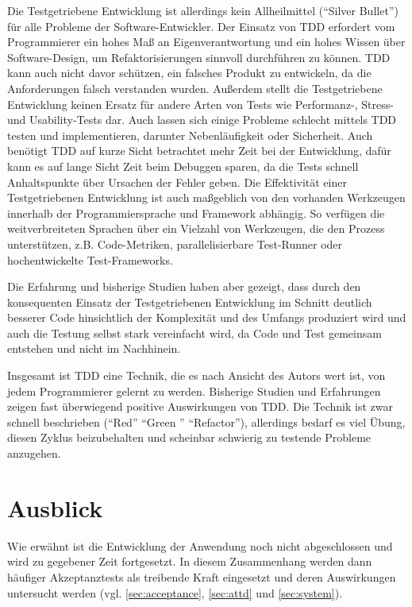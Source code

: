 Die Testgetriebene Entwicklung ist allerdings kein Allheilmittel ("`Silver Bullet"') für alle Probleme der Software-Entwickler. Der Einsatz von TDD erfordert vom Programmierer ein hohes Maß an Eigenverantwortung und ein hohes Wissen über Software-Design, um Refaktorisierungen sinnvoll durchführen zu können. TDD kann auch nicht davor schützen, ein falsches Produkt zu entwickeln, da die Anforderungen falsch verstanden wurden. Außerdem stellt die Testgetriebene Entwicklung keinen Ersatz für andere Arten von Tests wie Performanz-, Stress- und Usability-Tests dar. Auch lassen sich einige Probleme schlecht mittels TDD testen und implementieren, darunter Nebenläufigkeit oder Sicherheit. Auch benötigt TDD auf kurze Sicht betrachtet mehr Zeit bei der Entwicklung, dafür kann es auf lange Sicht Zeit beim Debuggen sparen, da die Tests schnell Anhaltspunkte über Ursachen der Fehler geben.
Die Effektivität einer Testgetriebenen Entwicklung ist auch maßgeblich von den vorhanden Werkzeugen innerhalb der Programmiersprache und Framework abhängig. So verfügen die weitverbreiteten Sprachen über ein Vielzahl von Werkzeugen, die den Prozess unterstützen, z.B. Code-Metriken, parallelisierbare Test-Runner oder hochentwickelte Test-Frameworks.

Die Erfahrung und bisherige Studien haben aber gezeigt, dass durch den konsequenten Einsatz der Testgetriebenen Entwicklung im Schnitt deutlich besserer Code hinsichtlich der Komplexität und des Umfangs produziert wird und auch die Testung selbst stark vereinfacht wird, da Code und Test gemeinsam entstehen und nicht im Nachhinein.

Insgesamt ist TDD eine Technik, die es nach Ansicht des Autors wert ist, von jedem Programmierer gelernt zu werden. Bisherige Studien und Erfahrungen zeigen fast überwiegend positive Auswirkungen von TDD. Die Technik ist zwar schnell beschrieben ("`Red"' "`Green "' "`Refactor"'), allerdings bedarf es viel Übung, diesen Zyklus beizubehalten und scheinbar schwierig zu testende Probleme anzugehen.

\section{Ausblick}
Wie erwähnt ist die Entwicklung der Anwendung noch nicht abgeschlossen und wird zu gegebener Zeit fortgesetzt. In diesem Zusammenhang werden dann häufiger Akzeptanztests als treibende Kraft eingesetzt und deren Auswirkungen untersucht werden (vgl. \ref{sec:acceptance}, \ref{sec:attd} und \ref{sec:system}).


